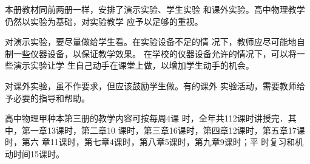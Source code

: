 本册教材同前两册一样，安排了演示实验、学生实验
和课外实验。高中物理教学仍然以实验为基础，对实验教学
应予以足够的重视。

对演示实验，要尽量做给学生看。在实验设备不足的情
况下，教师应尽可能地自制一些仪器设备，以保证教学效果。
在学校的仪器设备允许的情况下，可以将一些演示实验让学
生自己动手在课堂上做，以增加学生动手的机会。

对课外实验，虽不作要求，但应该鼓励学生做。有的课外
实验活动，需要教师给予必要的指导和帮助。

高中物理甲种本第三册的教学内容可按每周4课
时，全年共112课时讲授完．其中，第一章13课时，第二章10
课时，第三章16课时，第四章12课时，第五章17课时，第六
章11课时，第七章4课时，第八章5课时，第九章9课时；平
时复习和机动时间15课时。












